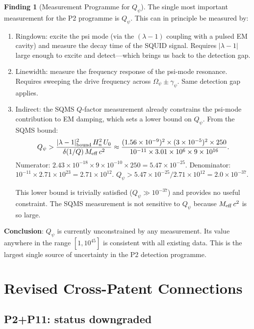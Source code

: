 \documentclass[11pt,twocolumn]{article}
\newcommand{\lam}{\lambda}
\newcommand{\Opsi}{\Omega_\psi}
\newcommand{\gpsi}{\gamma_\psi}
\newcommand{\Meff}{M_{\rm eff}}
\newcommand{\ee}[1]{\times 10^{#1}}
\newcommand{\Qpsi}{Q_\psi}
\newcommand{\Heff}{H_n}
\theoremstyle{definition}
\newtheorem{finding}[theorem]{Finding}
\theoremstyle{remark}
\begin{document}
\begin{finding}[Measurement Programme for $\Qpsi$]
\label{find:Qpsi_measurement}
The single most important measurement for the P2 programme is $\Qpsi$.
This can in principle be measured by:
\begin{enumerate}[nosep]
\item Ringdown: excite the psi mode (via the $(\lam-1)$ coupling with
  a pulsed EM cavity) and measure the decay time of the SQUID signal.
  Requires $|\lam-1|$ large enough to excite and detect---which brings
  us back to the detection gap.
\item Linewidth: measure the frequency response of the psi-mode
  resonance. Requires sweeping the drive frequency across $\Opsi
  \pm \gpsi$. Same detection gap applies.
\item Indirect: the SQMS $Q$-factor measurement already constrains the
  psi-mode contribution to EM damping, which sets a lower bound on
  $\Qpsi$. From the SQMS bound:
  \begin{equation}
  \Qpsi > \frac{|\lam-1|_{\rm bound}^2\,\Heff^2\,U_0}{\delta(1/Q)\,\Meff\,c^2}
  \approx \frac{(1.56\ee{-9})^2\times(3\ee{-5})^2\times 250}
  {10^{-11}\times 3.01\ee{6}\times 9\ee{16}}.
  \label{eq:Qpsi_indirect}
  \end{equation}
  Numerator: $2.43\ee{-18}\times 9\ee{-10}\times 250 = 5.47\ee{-25}$.
  Denominator: $10^{-11}\times 2.71\ee{23} = 2.71\ee{12}$.
  $\Qpsi > 5.47\ee{-25}/2.71\ee{12} = 2.0\ee{-37}$.

  This lower bound is trivially satisfied ($\Qpsi \gg 10^{-37}$) and
  provides no useful constraint. The SQMS measurement is not sensitive
  to $\Qpsi$ because $\Meff\,c^2$ is so large.
\end{enumerate}

\textbf{Conclusion}: $\Qpsi$ is currently unconstrained by any measurement.
Its value anywhere in the range $[1, 10^{45}]$ is consistent with all
existing data. This is the largest single source of uncertainty in the
P2 detection programme.
\end{finding}

\section{Revised Cross-Patent Connections}
\label{sec:cross_patents}

\subsection{P2+P11: status downgraded}
\label{sec:p2p11_revised}
\end{document}
